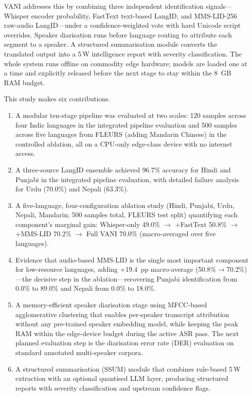 \documentclass[12pt, onecolumn]{IEEEtran}
\begin{document}
VANI addresses this by combining three independent identification signals---Whisper encoder probability, FastText text-based LangID, and MMS-LID-256 raw-audio LangID---under a confidence-weighted vote with hard Unicode script overrides. Speaker diarisation runs before language routing to attribute each segment to a speaker. A structured summarisation module converts the translated output into a 5\,W intelligence report with severity classification. The whole system runs offline on commodity edge hardware; models are loaded one at a time and explicitly released before the next stage to stay within the 8~GB RAM budget.

This study makes six contributions.
\begin{enumerate}
\item A modular ten-stage pipeline was evaluated at two scales: 120 samples across four Indic languages in the integrated pipeline evaluation and 500 samples across five languages from FLEURS (adding Mandarin Chinese) in the controlled ablation, all on a CPU-only edge-class device with no internet access.
\item A three-source LangID ensemble achieved 96.7\% accuracy for Hindi and Punjabi in the integrated pipeline evaluation, with detailed failure analysis for Urdu (70.0\%) and Nepali (63.3\%).
\item A five-language, four-configuration ablation study (Hindi, Punjabi, Urdu, Nepali, Mandarin; 500 samples total, FLEURS test split) quantifying each component's marginal gain: Whisper-only 49.0\% $\rightarrow$ +FastText 50.8\% $\rightarrow$ +MMS-LID 70.2\% $\rightarrow$ Full VANI 70.0\% (macro-averaged over five languages).
\item Evidence that audio-based MMS-LID is the single most important component for low-resource languages, adding +19.4~pp macro-average (50.8\%$\rightarrow$70.2\%)---the decisive step in the ablation---recovering Punjabi identification from 0.0\% to 89.0\% and Nepali from 0.0\% to 18.0\%.
\item A memory-efficient speaker diarisation stage using MFCC-based agglomerative clustering that enables per-speaker transcript attribution without any pre-trained speaker embedding model, while keeping the peak RAM within the edge-device budget during the active ASR pass. The next planned evaluation step is the diarisation error rate (DER) evaluation on standard annotated multi-speaker corpora.
\item A structured summarisation (SSUM) module that combines rule-based 5\,W extraction with an optional quantised LLM layer, producing structured reports with severity classification and upstream confidence flags.
\end{enumerate}
\end{document}

